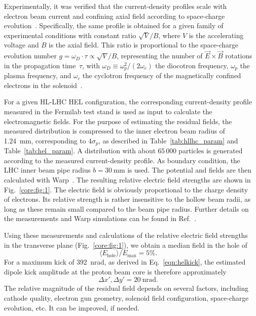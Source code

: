 \documentclass[%
 reprint,
 amsmath,amssymb,
 aps,
prstab,
longbibliography
]{revtex4-1}
\newcommand{\q}[2]{\ensuremath{#1\ \mathrm{#2}}} %
\begin{document}
Experimentally, it was verified that the current-density profiles
scale with electron beam current and confining axial field according
to space-charge evolution~\cite{Jo:PoP:2018,
  hel_res_field_stancari_2017}. Specifically, the same profile is
obtained for a given family of experimental conditions with constant
ratio $\sqrt{V} / B$, where $V$ is the accelerating voltage and $B$ is
the axial field. This ratio is proportional to the space-charge
evolution number $g = \omega_D \cdot \tau \propto \sqrt{V}/B$,
representing the number of $\vec{E} \times \vec{B}$ rotations in the
propagation time~$\tau$, with
$\omega_D \equiv \omega_p^2 / (2 \omega_c)$ the diocotron frequency,
$\omega_p$ the plasma frequency, and $\omega_c$ the cyclotron
frequency of the magnetically confined electrons in the
solenoid~\cite{Davidson:nonneutral-plasmas:2001}.

For a given HL-LHC HEL configuration, the corresponding
current-density profile measured in the Fermilab test stand is used as
input to calculate the electromagnetic fields. For the purpose of
estimating the residual fields, the measured distribution is
compressed to the inner electron beam radius of 1.24~mm, corresponding
to $4\sigma_p$, as described in Table~\ref{tab:hllhc_param} and
Table~\ref{tab:hel_param}. A distribution with about $65\,000$
particles is generated according to the measured current-density
profile. As boundary condition, the LHC inner beam pipe radius
$b = \q{30}{mm}$ is used. The potential and fields are then calculated
with Warp~\cite{warp}. The resulting relative electric field strengths
are shown in Fig.~\ref{core:fig:1}. The electric field is obviously
proportional to the charge density of electrons. Its relative strength
is rather insensitive to the hollow beam radii, as long as these
remain small compared to the beam pipe radius. Further details on the
measurements and Warp simulations can be found in
Ref.~\cite{hel_res_field_stancari_2017}.

Using these measurements and calculations of the relative electric
field strengths in the transverse plane (Fig.~\ref{core:fig:1}), we
obtain a median field in the hole of
%
\begin{equation}
  \langle E_\mathrm{hole} \rangle / E_\mathrm{max} =  5\%.
\end{equation}
%
For a maximum kick of 392~nrad, as derived in Eq.~\ref{eqn:helkick},
the estimated dipole kick amplitude at the proton beam core is therefore
approximately
%
\begin{equation}
  \label{eqn:kick_central}
  \Delta x' , \Delta y' = \q{20}{nrad}.
\end{equation}
%
The relative magnitude of the residual field depends on several
factors, including cathode quality, electron gun geometry, solenoid
field configuration, space-charge evolution, etc. It can be improved,
if needed.
\end{document}
